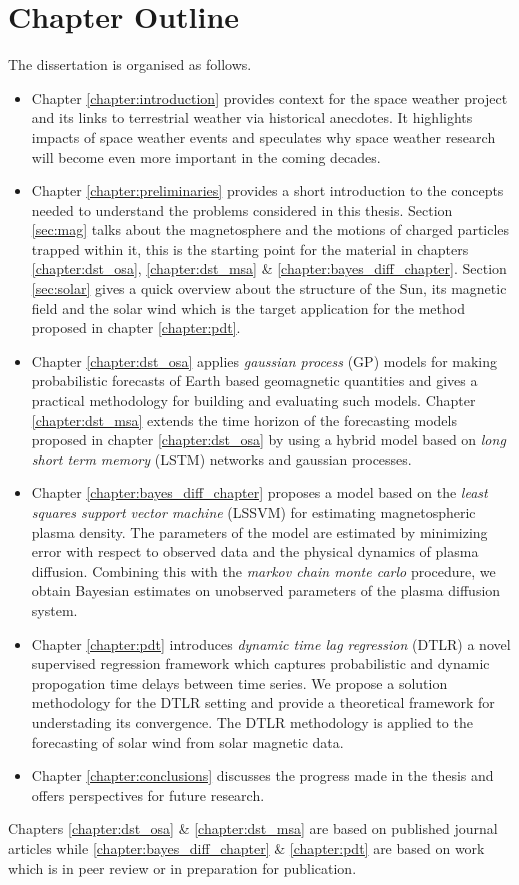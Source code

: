 \section{Chapter Outline}

The dissertation is organised as follows.

\begin{itemize}
    \item Chapter \ref{chapter:introduction} provides context for the space weather project and its 
    links to terrestrial weather via historical anecdotes. It highlights impacts of space weather events 
    and speculates why space weather research will become even more important in the coming decades.
    \item Chapter \ref{chapter:preliminaries} provides a short introduction to the concepts needed to 
    understand the problems considered in this thesis. Section \ref{sec:mag} talks about the magnetosphere and 
    the motions of charged particles trapped within it, this is the starting point for the material in chapters 
    \ref{chapter:dst_osa}, \ref{chapter:dst_msa} \& \ref{chapter:bayes_diff_chapter}. Section \ref{sec:solar} gives a 
    quick overview about the structure of the Sun, its magnetic field and the solar wind which is the target 
    application for the method proposed in chapter \ref{chapter:pdt}.
    \item Chapter \ref{chapter:dst_osa} applies \emph{gaussian process} (GP) models for making probabilistic forecasts of 
    Earth based geomagnetic quantities and gives a practical methodology for building and evaluating such models. 
    Chapter \ref{chapter:dst_msa} extends the time horizon of the forecasting models proposed in chapter \ref{chapter:dst_osa} 
    by using a hybrid model based on \emph{long short term memory} (LSTM) networks and gaussian processes.
    \item Chapter \ref{chapter:bayes_diff_chapter} proposes a model based on the \emph{least squares support vector machine} (LSSVM) 
    for estimating magnetospheric plasma density. The parameters of the model are estimated by minimizing error with respect to 
    observed data and the physical dynamics of plasma diffusion. Combining this with the \emph{markov chain monte carlo} procedure, we 
    obtain Bayesian estimates on unobserved parameters of the plasma diffusion system.   
    \item Chapter \ref{chapter:pdt} introduces \emph{dynamic time lag regression} (DTLR) a novel supervised regression framework 
    which captures probabilistic and dynamic propogation time delays between time series. We propose a solution methodology for 
    the DTLR setting and provide a theoretical framework for understading its convergence. The DTLR methodology is applied to the 
    forecasting of solar wind from solar magnetic data. 
    \item Chapter \ref{chapter:conclusions} discusses the progress made in the thesis and offers perspectives for future research.
\end{itemize}


Chapters \ref{chapter:dst_osa} \& \ref{chapter:dst_msa} are based on published journal articles while \ref{chapter:bayes_diff_chapter} \& 
\ref{chapter:pdt} are based on work which is in peer review or in preparation for publication.  